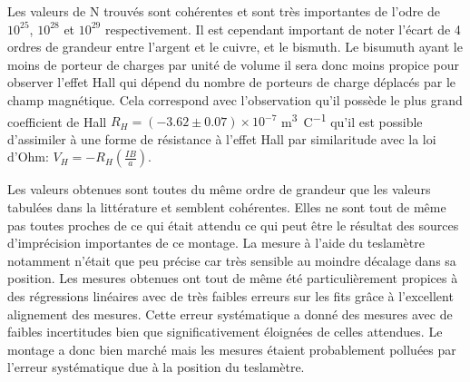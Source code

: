 Les valeurs de N trouvés sont cohérentes et sont très importantes de l'odre de \(10^{25}\), \(10^{28}\) et \(10^{29}\) respectivement. Il est cependant important de noter l'écart de 4 ordres de grandeur entre l'argent et le cuivre, et le bismuth. Le bisumuth ayant le moins de porteur de charges par unité de volume il sera donc moins propice pour observer l'effet Hall qui dépend du nombre de porteurs de charge déplacés par le champ magnétique. Cela correspond avec l'observation qu'il possède le plus grand coefficient de Hall \(R_H = (-3.62 \pm 0.07) \times 10^{-7}\) \si{\cubic \meter \per \coulomb} qu'il est possible d'assimiler à une forme de résistance à l'effet Hall par similaritude avec la loi d'Ohm: \(V_H = -R_H (\frac{IB}{a})\).

Les valeurs obtenues sont toutes du même ordre de grandeur que les valeurs tabulées dans la littérature \cite{notice} et semblent cohérentes. Elles ne sont tout de même pas toutes proches de ce qui était attendu ce qui peut être le résultat des sources d'imprécision importantes de ce montage. La mesure à l'aide du teslamètre notamment n'était que peu précise car très sensible au moindre décalage dans sa position. Les mesures obtenues ont tout de même été particulièrement propices à des régressions linéaires avec de très faibles erreurs sur les fits grâce à l'excellent alignement des mesures. Cette erreur systématique a donné des mesures avec de faibles incertitudes bien que significativement éloignées de celles attendues. Le montage a donc bien marché mais les mesures étaient probablement polluées par l'erreur systématique due à la position du teslamètre.